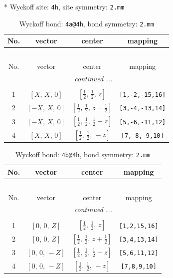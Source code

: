 \documentclass[fleqn,8pt]{jsarticle}
\begin{document}
* Wyckoff site: {\tt 4h}, site symmetry: {\tt 2.mm}
\renewcommand{\arraystretch}{1.2}
\begin{longtable}{cccc}
\caption{Wyckoff bond: {\tt 4a@4h}, bond symmetry: {\tt 2.mm}}
 \\
 \hline \hline
No. & vector & center & mapping \\ \hline \endfirsthead

\multicolumn{3}{l}{\tablename\ \thetable{}} \\
 \hline \hline
No. & vector & center & mapping \\ \hline \endhead

 \hline \hline
\multicolumn{3}{r}{\footnotesize\it continued ...} \\ \endfoot

 \hline \hline
\multicolumn{3}{r}{} \\ \endlastfoot

1 & $\left[ X,\, X,\, 0 \right]$ & $\left[ \frac{1}{2},\, \frac{1}{2},\, z \right]$ & {\tt [1,-2,-15,16]} \\ \hline
2 & $\left[ - X,\, X,\, 0 \right]$ & $\left[ \frac{1}{2},\, \frac{1}{2},\, z + \frac{1}{2} \right]$ & {\tt [3,-4,-13,14]} \\ \hline
3 & $\left[ - X,\, X,\, 0 \right]$ & $\left[ \frac{1}{2},\, \frac{1}{2},\, \frac{1}{2} - z \right]$ & {\tt [5,-6,-11,12]} \\ \hline
4 & $\left[ X,\, X,\, 0 \right]$ & $\left[ \frac{1}{2},\, \frac{1}{2},\, - z \right]$ & {\tt [7,-8,-9,10]} \\
\end{longtable}
\renewcommand{\arraystretch}{1.2}
\begin{longtable}{cccc}
\caption{Wyckoff bond: {\tt 4b@4h}, bond symmetry: {\tt 2.mm}}
 \\
 \hline \hline
No. & vector & center & mapping \\ \hline \endfirsthead

\multicolumn{3}{l}{\tablename\ \thetable{}} \\
 \hline \hline
No. & vector & center & mapping \\ \hline \endhead

 \hline \hline
\multicolumn{3}{r}{\footnotesize\it continued ...} \\ \endfoot

 \hline \hline
\multicolumn{3}{r}{} \\ \endlastfoot

1 & $\left[ 0,\, 0,\, Z \right]$ & $\left[ \frac{1}{2},\, \frac{1}{2},\, z \right]$ & {\tt [1,2,15,16]} \\ \hline
2 & $\left[ 0,\, 0,\, Z \right]$ & $\left[ \frac{1}{2},\, \frac{1}{2},\, z + \frac{1}{2} \right]$ & {\tt [3,4,13,14]} \\ \hline
3 & $\left[ 0,\, 0,\, - Z \right]$ & $\left[ \frac{1}{2},\, \frac{1}{2},\, \frac{1}{2} - z \right]$ & {\tt [5,6,11,12]} \\ \hline
4 & $\left[ 0,\, 0,\, - Z \right]$ & $\left[ \frac{1}{2},\, \frac{1}{2},\, - z \right]$ & {\tt [7,8,9,10]} \\
\end{longtable}
\end{document}

